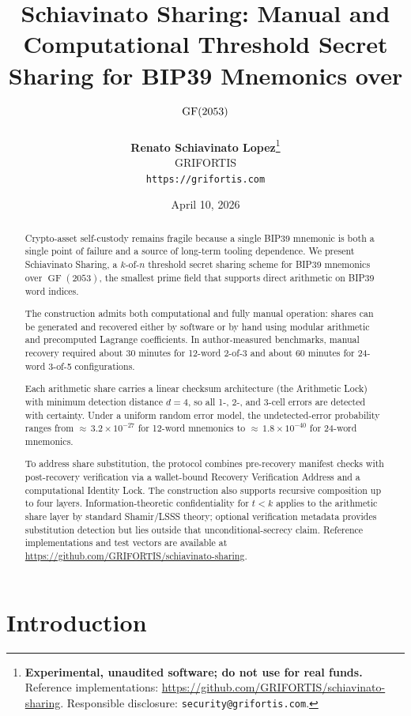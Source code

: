 \documentclass[11pt]{article}
\title{\textbf{Schiavinato Sharing: Manual and Computational Threshold Secret Sharing for BIP39 Mnemonics over $\GF(2053)$}}
\author{
    \textbf{Renato Schiavinato Lopez}\thanks{%
        \textbf{Experimental, unaudited software; do not use for real funds.}
        Reference implementations: \url{https://github.com/GRIFORTIS/schiavinato-sharing}.
        Responsible disclosure: \texttt{security@grifortis.com}.} \\
    GRIFORTIS \\
    \texttt{https://grifortis.com}
}
\date{April 10, 2026\\\SchiavinatoSharingVersion}
\newcommand{\GF}{\operatorname{GF}}
\begin{document}
\maketitle

\begin{abstract}
Crypto-asset self-custody remains fragile because a single BIP39 mnemonic is both a single point of failure and a source of long-term tooling dependence. We present Schiavinato Sharing, a $k$-of-$n$ threshold secret sharing scheme for BIP39 mnemonics over $\GF(2053)$, the smallest prime field that supports direct arithmetic on BIP39 word indices.

The construction admits both computational and fully manual operation: shares can be generated and recovered either by software or by hand using modular arithmetic and precomputed Lagrange coefficients. In author-measured benchmarks, manual recovery required about 30 minutes for 12-word 2-of-3 and about 60 minutes for 24-word 3-of-5 configurations.

Each arithmetic share carries a linear checksum architecture (the Arithmetic Lock) with minimum detection distance $d = 4$, so all 1-, 2-, and 3-cell errors are detected with certainty. Under a uniform random error model, the undetected-error probability ranges from ${\approx}\,3.2 \times 10^{-27}$ for 12-word mnemonics to ${\approx}\,1.8 \times 10^{-40}$ for 24-word mnemonics.

To address share substitution, the protocol combines pre-recovery manifest checks with post-recovery verification via a wallet-bound Recovery Verification Address and a computational Identity Lock. The construction also supports recursive composition up to four layers. Information-theoretic confidentiality for $t < k$ applies to the arithmetic share layer by standard Shamir/LSSS theory; optional verification metadata provides substitution detection but lies outside that unconditional-secrecy claim. Reference implementations and test vectors are available at \url{https://github.com/GRIFORTIS/schiavinato-sharing}.
\end{abstract}

\section{Introduction}
\label{sec:intro}
\end{document}
